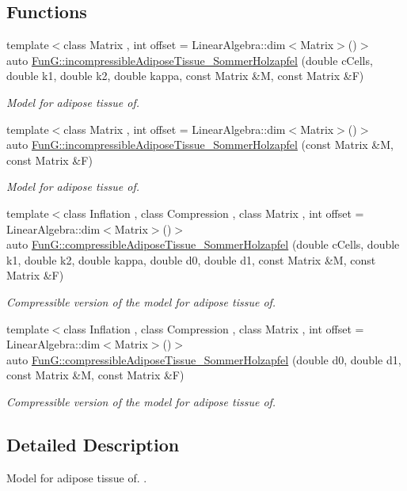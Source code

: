 \subsection*{\-Functions}
\begin{DoxyCompactItemize}
\item 
{\footnotesize template$<$class Matrix , int offset = \-Linear\-Algebra\-::dim$<$\-Matrix$>$()$>$ }\\auto \hyperlink{group__Biomechanics_gac269eefc1abb994044e1634c20a98061}{\-Fun\-G\-::incompressible\-Adipose\-Tissue\-\_\-\-Sommer\-Holzapfel} (double c\-Cells, double k1, double k2, double kappa, const \-Matrix \&\-M, const \-Matrix \&\-F)
\begin{DoxyCompactList}\small\item\em \-Model for adipose tissue of. \end{DoxyCompactList}\item 
{\footnotesize template$<$class Matrix , int offset = \-Linear\-Algebra\-::dim$<$\-Matrix$>$()$>$ }\\auto \hyperlink{group__Biomechanics_ga01ab128bcf179f4431b0270179af9e20}{\-Fun\-G\-::incompressible\-Adipose\-Tissue\-\_\-\-Sommer\-Holzapfel} (const \-Matrix \&\-M, const \-Matrix \&\-F)
\begin{DoxyCompactList}\small\item\em \-Model for adipose tissue of. \end{DoxyCompactList}\item 
{\footnotesize template$<$class Inflation , class Compression , class Matrix , int offset = \-Linear\-Algebra\-::dim$<$\-Matrix$>$()$>$ }\\auto \hyperlink{group__Biomechanics_ga5c3388564c0420b62e58f48c739d27f1}{\-Fun\-G\-::compressible\-Adipose\-Tissue\-\_\-\-Sommer\-Holzapfel} (double c\-Cells, double k1, double k2, double kappa, double d0, double d1, const \-Matrix \&\-M, const \-Matrix \&\-F)
\begin{DoxyCompactList}\small\item\em \-Compressible version of the model for adipose tissue of. \end{DoxyCompactList}\item 
{\footnotesize template$<$class Inflation , class Compression , class Matrix , int offset = \-Linear\-Algebra\-::dim$<$\-Matrix$>$()$>$ }\\auto \hyperlink{group__Biomechanics_ga27bb3f7c579ce8c21a69ea4d4d0169d7}{\-Fun\-G\-::compressible\-Adipose\-Tissue\-\_\-\-Sommer\-Holzapfel} (double d0, double d1, const \-Matrix \&\-M, const \-Matrix \&\-F)
\begin{DoxyCompactList}\small\item\em \-Compressible version of the model for adipose tissue of. \end{DoxyCompactList}\end{DoxyCompactItemize}


\subsection{\-Detailed \-Description}
\-Model for adipose tissue of. \cite{Sommer2013}. 